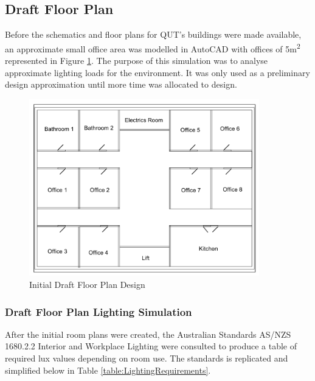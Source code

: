 
\subsection{Draft Floor Plan} \label{section:draft-floor-plan}

Before the schematics and floor plans for QUT's buildings were made available, an approximate small office area was modelled in AutoCAD with offices of 5\si{m^2} represented in Figure \ref{fig:RoughFloorplan}. The purpose of this simulation was to analyse approximate lighting loads for the environment. It was only used as a preliminary design approximation until more time was allocated to design.  

\begin{figure}[H]
\hfill\includegraphics[width = 100mm]{images/Rough_Floorplan}\hspace*{\fill}
\caption{Initial Draft Floor Plan Design} 
\label{fig:RoughFloorplan}
\end{figure} 

\subsubsection{Draft Floor Plan Lighting Simulation}

After the initial room plans were created, the Australian Standards AS/NZS 1680.2.2 Interior and Workplace Lighting were consulted to produce a table of required lux values depending on room use. The standards is replicated and simplified below in Table \ref{table:LightingRequirements}.

